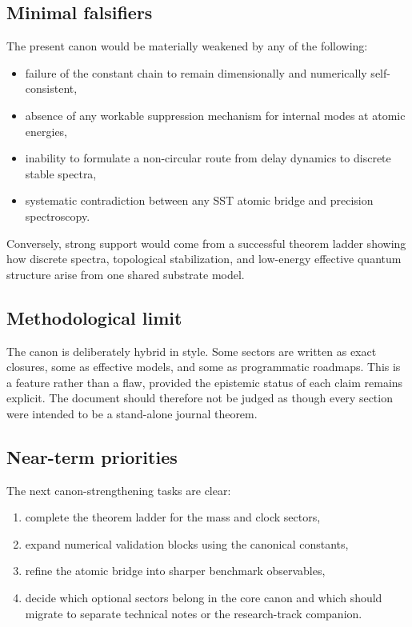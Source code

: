 \documentclass[11pt]{article}
\theoremstyle{definition}
\theoremstyle{plain}
\theoremstyle{remark}
\begin{document}
    \subsection{Minimal falsifiers}
        The present canon would be materially weakened by any of the following:
        \begin{itemize}
            \item failure of the constant chain to remain dimensionally and numerically self-consistent,
            \item absence of any workable suppression mechanism for internal modes at atomic energies,
            \item inability to formulate a non-circular route from delay dynamics to discrete stable spectra,
            \item systematic contradiction between any SST atomic bridge and precision spectroscopy.
        \end{itemize}
        Conversely, strong support would come from a successful theorem ladder showing how discrete spectra, topological stabilization, and low-energy effective quantum structure arise from one shared substrate model.

    \subsection{Methodological limit}
        The canon is deliberately hybrid in style. Some sectors are written as exact closures, some as effective models, and some as programmatic roadmaps. This is a feature rather than a flaw, provided the epistemic status of each claim remains explicit. The document should therefore not be judged as though every section were intended to be a stand-alone journal theorem.

    \subsection{Near-term priorities}
        The next canon-strengthening tasks are clear:
        \begin{enumerate}
            \item complete the theorem ladder for the mass and clock sectors,
            \item expand numerical validation blocks using the canonical constants,
            \item refine the atomic bridge into sharper benchmark observables,
            \item decide which optional sectors belong in the core canon and which should migrate to separate technical notes or the research-track companion.
        \end{enumerate}
\end{document}
